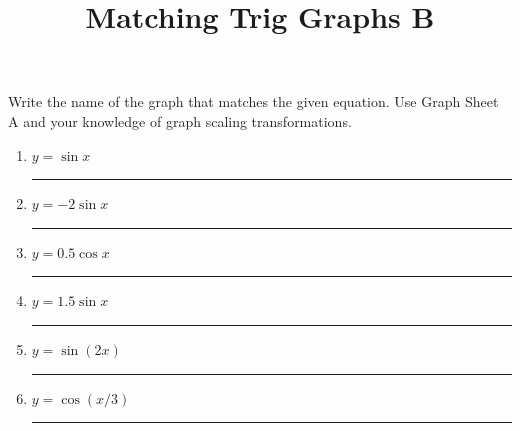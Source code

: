 \documentclass{article}
\begin{document}
\title{Matching Trig Graphs B}
\maketitle
\noindent
Write the name of the graph that matches the given equation. Use Graph Sheet
A and your knowledge of graph scaling transformations.
\begin{multicols}{2}
\begin{enumerate}
	\item $y=\sin x$ \hspace{1cm} \rule{5cm}{0.5pt}
	\item $y=-2 \sin x$ \hspace{1cm} \rule{5cm}{0.5pt}
	\item $y=0.5 \cos x$ \hspace{1cm} \rule{5cm}{0.5pt}
	\item $y=1.5 \sin x$ \hspace{1cm} \rule{5cm}{0.5pt}
	\item $y=\sin (2x) $ \hspace{1cm} \rule{5cm}{0.5pt}
	\item $y=\cos(x/3)$ \hspace{1cm} \rule{5cm}{0.5pt}
\end{enumerate}


\end{multicols}
\end{document}
